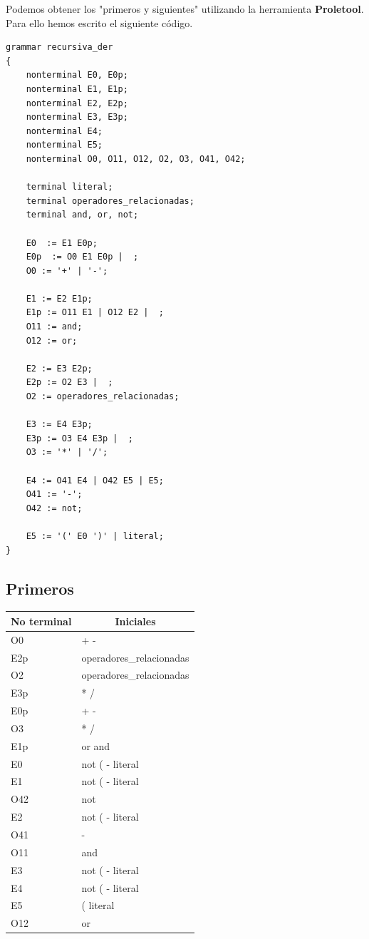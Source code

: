 \documentclass{article}
\begin{document}
Podemos obtener los "primeros y siguientes" utilizando la herramienta \textbf{Proletool}. Para ello hemos escrito el siguiente código.


\begin{lstlisting}
grammar recursiva_der
{
	nonterminal E0, E0p;
	nonterminal E1, E1p;
	nonterminal E2, E2p;
	nonterminal E3, E3p;
	nonterminal E4;
	nonterminal E5;
	nonterminal O0, O11, O12, O2, O3, O41, O42; 
	
	terminal literal;
	terminal operadores_relacionadas; 
	terminal and, or, not;
	
	E0  := E1 E0p; 
	E0p  := O0 E1 E0p |  ; 
	O0 := '+' | '-'; 
	
	E1 := E2 E1p; 	
	E1p := O11 E1 | O12 E2 |  ; 
	O11 := and; 
	O12 := or;
	
	E2 := E3 E2p; 
	E2p := O2 E3 |  ; 
	O2 := operadores_relacionadas; 
	
	E3 := E4 E3p; 
	E3p := O3 E4 E3p |  ; 
	O3 := '*' | '/'; 
	
	E4 := O41 E4 | O42 E5 | E5; 
	O41 := '-'; 	
	O42 := not; 
	
	E5 := '(' E0 ')' | literal; 
} 
\end{lstlisting}

\newpage
\subsection{Primeros}
\begin{tabular}{|l|l|}
	\hline
	\multicolumn{1}{|c|}{No terminal} & \multicolumn{1}{c|}{Iniciales} \\ \hline
O0 &	+ -\\ \hline
E2p &	operadores\_relacionadas\\ \hline
O2 &	operadores\_relacionadas\\ \hline
E3p &	* /\\ \hline
E0p &	+ -\\ \hline
O3 &	* /\\ \hline
E1p &	or and\\ \hline
E0 &	not ( - literal\\ \hline
E1 &	not ( - literal\\ \hline
O42 &	not\\ \hline
E2 &	not ( - literal\\ \hline
O41 &	-\\ \hline
O11 &	and\\ \hline
E3 &	not ( - literal\\ \hline
E4 &	not ( - literal\\ \hline
E5 &	( literal\\ \hline
O12 &	or\\ \hline
\end{tabular}
\end{document}
